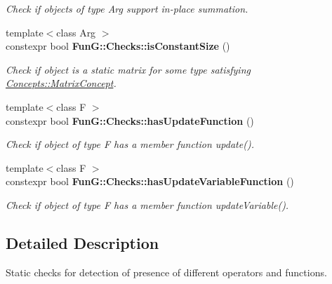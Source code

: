 \begin{DoxyCompactItemize}
\begin{DoxyCompactList}\small\item\em Check if objects of type Arg support in-\/place summation. \end{DoxyCompactList}\item 
{\footnotesize template$<$class Arg $>$ }\\constexpr bool {\bfseries Fun\-G\-::\-Checks\-::is\-Constant\-Size} ()
\begin{DoxyCompactList}\small\item\em Check if object is a static matrix for some type satisfying \hyperlink{structFunG_1_1Concepts_1_1MatrixConcept}{Concepts\-::\-Matrix\-Concept}. \end{DoxyCompactList}\item 
\hypertarget{namespaceFunG_1_1Checks_a600c419e4c393f442199465579dc1306}{{\footnotesize template$<$class F $>$ }\\constexpr bool {\bfseries Fun\-G\-::\-Checks\-::has\-Update\-Function} ()}\label{namespaceFunG_1_1Checks_a600c419e4c393f442199465579dc1306}

\begin{DoxyCompactList}\small\item\em Check if object of type F has a member function update(). \end{DoxyCompactList}\item 
\hypertarget{namespaceFunG_1_1Checks_abf97e91c1bf458c62f9f3a3ecf5edf1a}{{\footnotesize template$<$class F $>$ }\\constexpr bool {\bfseries Fun\-G\-::\-Checks\-::has\-Update\-Variable\-Function} ()}\label{namespaceFunG_1_1Checks_abf97e91c1bf458c62f9f3a3ecf5edf1a}

\begin{DoxyCompactList}\small\item\em Check if object of type F has a member function update\-Variable(). \end{DoxyCompactList}\end{DoxyCompactItemize}


\subsection{Detailed Description}
Static checks for detection of presence of different operators and functions. 